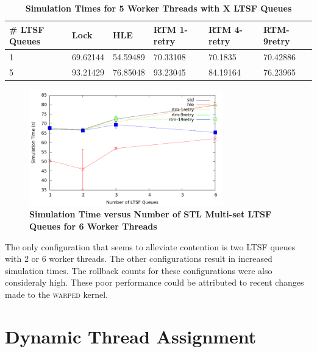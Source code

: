 \documentclass[11pt]{book}
\begin{document}
\begin{table}[H]
    \centering
    \begin{tabular}{l|p{2cm}|p{2cm}|p{2cm}|p{2cm}|p{2cm}}
        \textbf{\# LTSF Queues}&Lock &HLE &RTM 1-retry &RTM 4-retry &RTM-9retry \\
        \hline
        \midrule
            1 &69.62144  &54.59489 &70.33108  &70.1835  &70.42886 \\ 
            5 &93.21429  &76.85048 &93.23045  &84.19164 &76.23965 \\
    \end{tabular}
    \caption{\textbf{Simulation Times for 5 Worker Threads with X LTSF Queues}}
    \label{tab:noThrMig_5threadsXschq}
\end{table}

\begin{figure}[H]
    \centering
    \graphicspath{ {./figures/} }
    \includegraphics[width=0.75\textwidth,keepaspectratio]{noThrMig-hugeEpidemicSim-timeVSschedQs-multiset-6thread}
    \caption{\textbf{Simulation Time versus Number of STL Multi-set LTSF Queues
    for 6 Worker Threads}}
    \label{fig:noThrMig_timeVSschq_6threads}
\end{figure}

The only configuration that seems to alleviate contention is two LTSF queues
with 2 or 6 worker threads.  The other configurations result in increased
simulation times.  The rollback counts for these configurations were also
consideraly high.  These poor performance could be attributed to recent changes
made to the \textsc{warped} kernel.\par

\section{Dynamic Thread Assignment}
\end{document}
